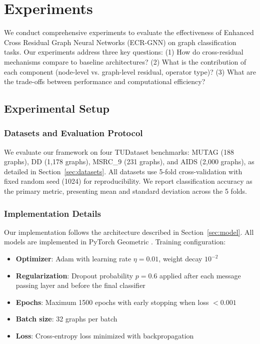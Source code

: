 \section{Experiments}
\label{sec:experiments}

We conduct comprehensive experiments to evaluate the effectiveness of Enhanced Cross Residual Graph Neural Networks (ECR-GNN) on graph classification tasks. Our experiments address three key questions: (1) How do cross-residual mechanisms compare to baseline architectures? (2) What is the contribution of each component (node-level vs. graph-level residual, operator type)? (3) What are the trade-offs between performance and computational efficiency?

\subsection{Experimental Setup}

\subsubsection{Datasets and Evaluation Protocol}

We evaluate our framework on four TUDataset benchmarks: MUTAG (188 graphs), DD (1,178 graphs), MSRC\_9 (231 graphs), and AIDS (2,000 graphs), as detailed in Section~\ref{sec:datasets}. All datasets use 5-fold cross-validation with fixed random seed (1024) for reproducibility. We report classification accuracy as the primary metric, presenting mean and standard deviation across the 5 folds.

\subsubsection{Implementation Details}

Our implementation follows the architecture described in Section~\ref{sec:model}. All models are implemented in PyTorch Geometric \cite{fey2019fast}. Training configuration:
\begin{itemize}
    \item \textbf{Optimizer}: Adam with learning rate $\eta = 0.01$, weight decay $10^{-2}$
    \item \textbf{Regularization}: Dropout probability $p = 0.6$ applied after each message passing layer and before the final classifier
    \item \textbf{Epochs}: Maximum 1500 epochs with early stopping when loss $< 0.001$
    \item \textbf{Batch size}: 32 graphs per batch
    \item \textbf{Loss}: Cross-entropy loss minimized with backpropagation
\end{itemize}

